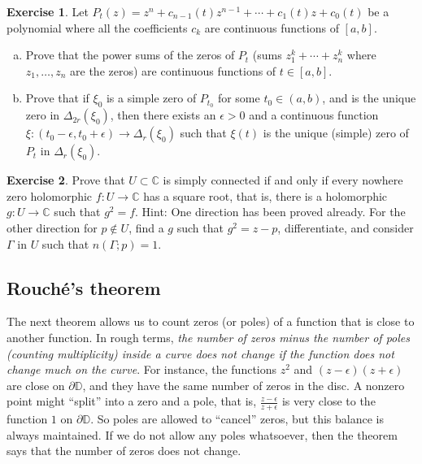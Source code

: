 \documentclass[12pt,openany]{book}
\newcommand{\C}{{\mathbb{C}}}
\newcommand{\D}{{\mathbb{D}}}
\newcommand{\myquote}[1]{``#1''}
\theoremstyle{plain}
\theoremstyle{remark}
\theoremstyle{definition}
\newenvironment{exbox}{%
    \def\FrameCommand{\vrule width 1pt \relax\hspace{10pt}}%
    \MakeFramed{\advance\hsize-\width\FrameRestore}%
}{%
    \endMakeFramed
}
\newenvironment{exparts}{%
    \leavevmode\begin{enumerate}[a),noitemsep,topsep=0pt,parsep=0pt,partopsep=0pt]
}{%
    \end{enumerate}
}
\theoremstyle{exercise}
\newtheorem{exercise}{Exercise}[section]
\theoremstyle{example}
\begin{document}
\begin{exbox}
\begin{exercise}
Let $P_t(z) = z^n + c_{n-1}(t) z^{n-1} + \cdots + c_1(t) z + c_0(t)$
be a polynomial where all the coefficients $c_k$ are continuous functions
of $[a,b]$.
\begin{exparts}
\item
Prove that the power sums of the zeros of $P_t$
(sums $z_1^k+\cdots+z_n^k$ where $z_1,\ldots,z_n$ are the zeros)
are
continuous functions of $t \in [a,b]$.
\item
Prove that if $\xi_0$ is a simple zero of $P_{t_0}$ for some $t_0 \in (a,b)$,
and is the unique zero in
$\Delta_{2r}(\xi_0)$, then
there exists an $\epsilon > 0$ and a continuous function $\xi \colon
(t_0-\epsilon,t_0+\epsilon) \to \Delta_r(\xi_0)$ such that $\xi(t)$
is the unique (simple) zero of $P_t$ in $\Delta_r(\xi_0)$.
\end{exparts}
\end{exercise}

\begin{exercise}
Prove that $U \subset \C$ is simply connected if and only if every nowhere
zero holomorphic $f \colon U \to \C$ has a square root, that is, there is a
holomorphic $g \colon U \to \C$ such that $g^2=f$.  Hint: One direction has
been proved already.  For the other direction for $p \notin U$,
find a $g$ such that $g^2 = z-p$, differentiate, and consider
$\Gamma$ in $U$ such that $n(\Gamma;p) = 1$.
\end{exercise}
\end{exbox}

\subsection{Rouch\'e's theorem}

The next theorem allows us to count zeros (or poles) of a function that is
close to another function.  In rough terms,
\emph{the number of zeros minus the
number of poles (counting multiplicity) inside a curve does not change
if the function does not change much on the curve}.
For instance, the functions $z^2$ and $(z-\epsilon)(z+\epsilon)$
are close on $\partial \D$, and they have the same number of
zeros in the disc.
A nonzero point might \myquote{split} into a zero and a
pole, that is, $\frac{z-\epsilon}{z+\epsilon}$ is very close to the function
$1$ on $\partial \D$.  So poles are allowed to \myquote{cancel} zeros, but this
balance is always maintained.  If we do not allow any poles
whatsoever, then the theorem says that the number of zeros does not change.
\end{document}
